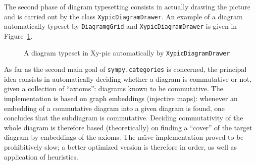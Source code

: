The second phase of diagram typesetting consists in actually drawing the picture
and is carried out by the class \texttt{XypicDiagramDrawer}.  An example of a
diagram automatically typeset by \texttt{DiagramgGrid} and
\texttt{XypicDiagramDrawer} is given in Figure~\ref{fig:cat:loops}.
\begin{figure}[h]
  \centerline{
  }
  \caption{A diagram typeset in Xy-pic automatically by \texttt{XypicDiagramDrawer}}\label{fig:cat:loops}
\end{figure}

As far as the second main goal of \texttt{sympy.categories} is concerned, the principal idea
consists in automatically deciding whether a diagram is commutative or not,
given a collection of ``axioms'': diagrams known to be commutative. The
implementation is based on graph embeddings (injective maps): whenever an
embedding of a commutative diagram into a given diagram is found, one
concludes that the subdiagram is commutative. Deciding commutativity of the
whole diagram is therefore based (theoretically) on finding a ``cover'' of the
target diagram by embeddings of the axioms. The na\"{\i}ve implementation
proved to be prohibitively slow; a better optimized version is therefore in
order, as well as application of heuristics.
